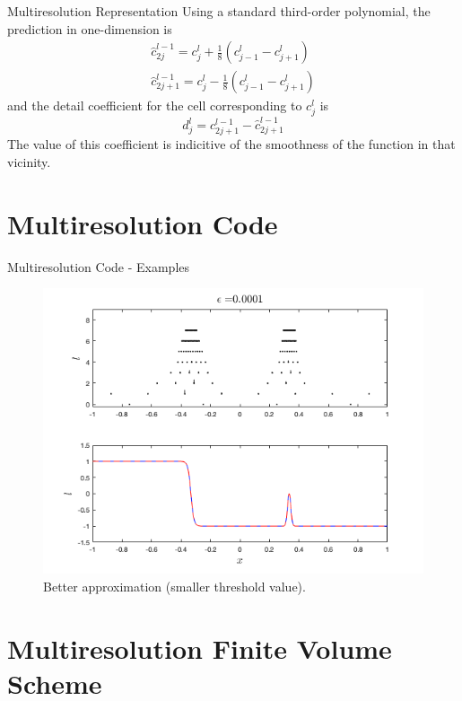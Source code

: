 \documentclass{beamer}
\begin{document}
\begin{frame}[center]{Multiresolution Representation}
    Using a standard third-order polynomial, the prediction in one-dimension is
    \begin{align*}
      \hat{c}^{l-1}_{2j} = c^{l}_{j} + \frac{1}{8} \left( c^{l}_{j-1} - c^{l}_{j+1} \right) \\
      \hat{c}^{l-1}_{2j+1} = c^{l}_{j} - \frac{1}{8} \left( c^{l}_{j-1} - c^{l}_{j+1} \right)
    \end{align*}
    and the detail coefficient for the cell corresponding to $c^{l}_{j}$ is
    \begin{equation*}
      d^{l}_{j} = c_{2j+1}^{l-1} - \hat{c}_{2j+1}^{l-1}
    \end{equation*}
    The value of this coefficient is indicitive of the smoothness of the function in that
    vicinity.
\end{frame}


\section{Multiresolution Code}

\begin{frame}[center]{Multiresolution Code - Examples}
	\begin{figure}
		\center
		\includegraphics[scale=0.5]{plots/spike-med.png}
		\caption{Better approximation (smaller threshold value).}
	\end{figure}
\end{frame}

\section{Multiresolution Finite Volume Scheme}
\end{document}
